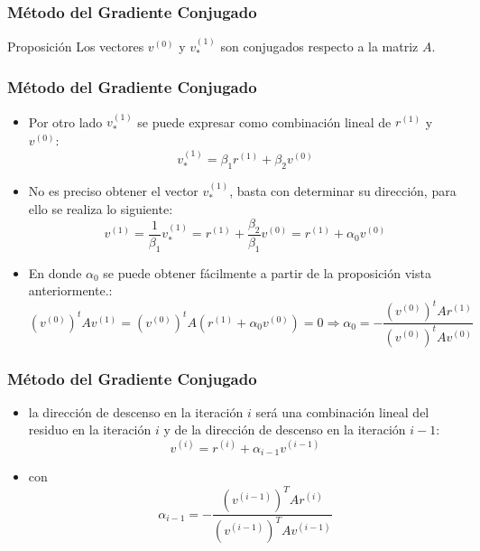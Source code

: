 \documentclass[10pt]{beamer}
\begin{document}
\begin{frame}
  \frametitle{M\'etodo del Gradiente Conjugado}
  \begin{block}{Proposici\'on}
    Los vectores $v^{(0)}$ y $v_*^{(1)}$ son conjugados respecto a la matriz $A$.    
  \end{block}
\end{frame}
\begin{frame}
  \frametitle{M\'etodo del Gradiente Conjugado}
  \begin{itemize}
    \item<1->Por otro lado $v^{(1)}_*$ se puede expresar como combinaci\'on lineal de $r^{(1)}$ y $v^{(0)}$:
    $$
    v^{(1)}_* = \beta_1r^{(1)}+\beta_2v^{(0)}
    $$
    \item<2-> No es preciso obtener el vector $v^{(1)}_*$, basta con determinar su direcci\'on, para ello se realiza lo siguiente:
    $$
    v^{(1)} = \frac{1}{\beta_1}v^{(1)}_* = r^{(1)} + \frac{\beta_2}{\beta_1}v^{(0)} = r^{(1)} + \alpha_0v^{(0)} 
    $$
    \item<3->En donde $\alpha_0$ se puede obtener f\'acilmente a partir de la proposici\'on vista anteriormente.:
    $$
    (v^{(0)})^tAv^{(1)} = (v^{(0)})^tA( r^{(1)} + \alpha_0v^{(0)} ) = 0 \Rightarrow \alpha_0=-\frac{(v^{(0)})^tAr^{(1)}}{(v^{(0)})^tAv^{(0)}}
    $$
  \end{itemize}
\end{frame}
\begin{frame}
  \frametitle{M\'etodo del Gradiente Conjugado}
  \begin{itemize}
    \item<1->la direcci\'on de descenso en la iteraci\'on $i$ ser\'a una combinaci\'on lineal del residuo en la iteraci\'on $i$ y de la direcci\'on de descenso en la iteraci\'on $i - 1$:
    $$
    v^{(i)} = r^{(i)} + \alpha_{i-1}v^{(i-1)}
    $$
    \item<2->con
    $$
    \alpha_{i-1} = -\displaystyle\frac{(v^{(i-1)})^TAr^{(i)}}{(v^{(i-1)})^TAv^{(i-1)}}
    $$
  \end{itemize}
\end{frame}
\end{document}
